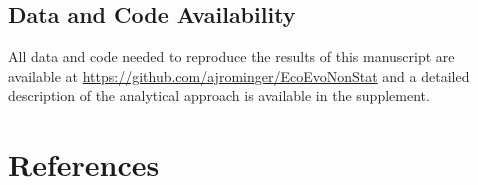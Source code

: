 \documentclass[
]{article}
\begin{document}
\hypertarget{data-and-code-availability}{%
\subsection{Data and Code
Availability}\label{data-and-code-availability}}

All data and code needed to reproduce the results of this manuscript are
available at \url{https://github.com/ajrominger/EcoEvoNonStat} and a
detailed description of the analytical approach is available in the
supplement.

\clearpage

\hypertarget{references}{%
\section*{References}\label{references}}
\end{document}

